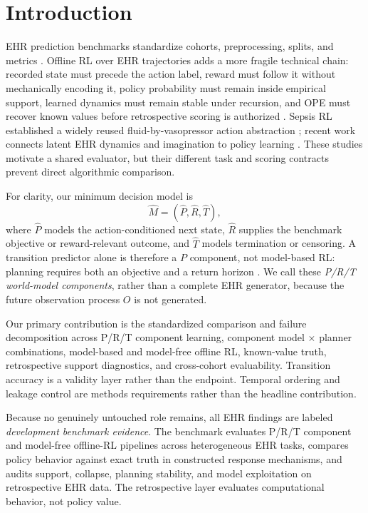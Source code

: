 \documentclass[sigconf,review]{acmart}
\begin{document}
\section{Introduction}

EHR prediction benchmarks standardize cohorts, preprocessing, splits, and metrics \cite{harutyunyan2019multitask,wornow2023ehrshot,wang2020mimic}. Offline RL over EHR trajectories adds a more fragile technical chain: recorded state must precede the action label, reward must follow it without mechanically encoding it, policy probability must remain inside empirical support, learned dynamics must remain stable under recursion, and OPE must recover known values before retrospective scoring is authorized \cite{tang2021model,tang2026offbeat}. Sepsis RL established a widely reused fluid-by-vasopressor action abstraction \cite{komorowski2018artificial}; recent work connects latent EHR dynamics and imagination to policy learning \cite{xu2026meddreamer}. These studies motivate a shared evaluator, but their different task and scoring contracts prevent direct algorithmic comparison.

For clarity, our minimum decision model is
\begin{equation}
\widehat M=(\widehat P,\widehat R,\widehat T),
\end{equation}
where $\widehat P$ models the action-conditioned next state, $\widehat R$ supplies the benchmark objective or reward-relevant outcome, and $\widehat T$ models termination or censoring. A transition predictor alone is therefore a $P$ component, not model-based RL: planning requires both an objective and a return horizon \cite{sutton2018reinforcement}. We call these \emph{P/R/T world-model components}, rather than a complete EHR generator, because the future observation process $O$ is not generated.

Our primary contribution is the standardized comparison and failure decomposition across P/R/T component learning, component model $\times$ planner combinations, model-based and model-free offline RL, known-value truth, retrospective support diagnostics, and cross-cohort evaluability. Transition accuracy is a validity layer rather than the endpoint. Temporal ordering and leakage control are methods requirements rather than the headline contribution.

Because no genuinely untouched role remains, all EHR findings are labeled \emph{development benchmark evidence}. The benchmark evaluates P/R/T component and model-free offline-RL pipelines across heterogeneous EHR tasks, compares policy behavior against exact truth in constructed response mechanisms, and audits support, collapse, planning stability, and model exploitation on retrospective EHR data. The retrospective layer evaluates computational behavior, not policy value.
\end{document}
